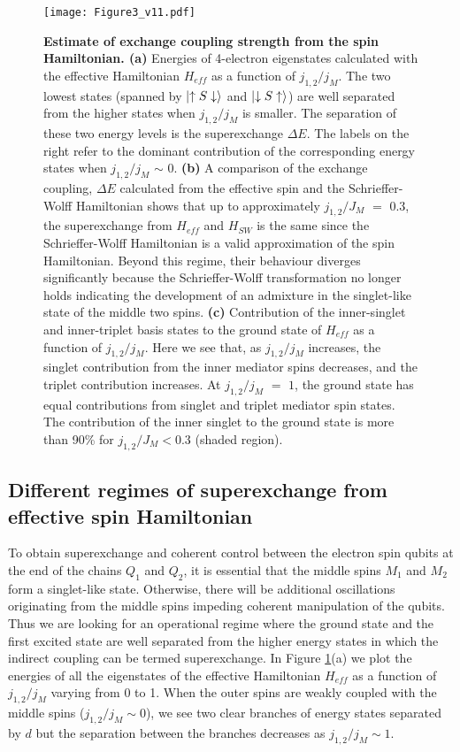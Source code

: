 \documentclass[%
showkeys,
 amsmath,amssymb,
 aps,
prb,
]{revtex4-2}
\begin{document}
\begin{figure}[htb!]
    \centering
    \texttt{[image: Figure3\_v11.pdf]}
    \caption{\textbf{Estimate of exchange coupling strength from the spin Hamiltonian. (a)} Energies of 4-electron eigenstates calculated with the effective Hamiltonian $H_{eff}$ as a function of $j_{1,2}/j_M$. The two lowest states (spanned by $\ket{\uparrow S \downarrow}$ and $\ket{\downarrow S \uparrow}$) are well separated from the higher states when $j_{1,2}/j_M$ is smaller. The separation of these two energy levels is the superexchange $\Delta E$. The labels on the right refer to the dominant contribution of the corresponding energy states when $j_{1,2}/j_M$ $\sim$ $0$. \textbf{(b)} A comparison of the exchange coupling, $\Delta E$ calculated from the effective spin and the Schrieffer-Wolff Hamiltonian shows that up to approximately $j_{1,2}/J_M$ $=$ $0.3$, the superexchange from $H_{eff}$ and $H_{SW}$ is the same since the Schrieffer-Wolff Hamiltonian is a valid approximation of the spin Hamiltonian. Beyond this regime, their behaviour diverges significantly because the Schrieffer-Wolff transformation no longer holds indicating the development of an admixture in the singlet-like state of the middle two spins. \textbf{(c)} Contribution of the inner-singlet and inner-triplet basis states to the ground state of $H_{eff}$ as a function of $j_{1,2}/j_M$. Here we see that, as $j_{1,2}/j_M$ increases, the singlet contribution from the inner mediator spins decreases, and the triplet contribution increases. At $j_{1,2}/j_M$ $=$ $1$, the ground state has equal contributions from singlet and triplet mediator spin states. The contribution of the inner singlet to the ground state is more than 90\% for $j_{1,2}/J_M<0.3$ (shaded region).}
    \label{fig2}
\end{figure}

\subsection{Different regimes of superexchange from effective spin Hamiltonian}
To obtain superexchange and coherent control between the electron spin qubits at the end of the chains $Q_1$ and $Q_2$, it is essential that the middle spins $M_1$ and $M_2$ form a singlet-like state. Otherwise, there will be additional oscillations originating from the middle spins impeding coherent manipulation of the qubits. Thus we are looking for an operational regime where the ground state and the first excited state are well separated from the higher energy states in which the indirect coupling can be termed superexchange. In Figure \ref{fig2}(a) we plot the energies of all the eigenstates of the effective Hamiltonian $H_{eff}$ as a function of $j_{1,2}/j_M$ varying from 0 to 1. When the outer spins are weakly coupled with the middle spins ($j_{1,2}/j_M\sim0$), we see two clear branches of energy states separated by $d$ but the separation between the branches decreases as $j_{1,2}/j_M \sim 1$. 
\end{document}
